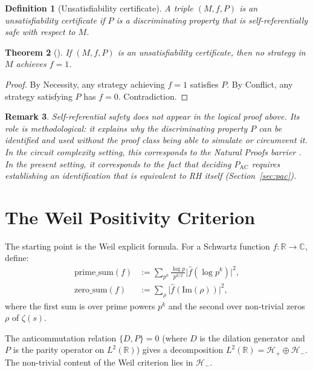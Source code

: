 \documentclass[12pt]{article}
\newtheorem{theorem}{Theorem}[section]
\newtheorem{definition}[theorem]{Definition}
\newtheorem{remark}[theorem]{Remark}
\newcommand{\RR}{\mathbb{R}}
\newcommand{\CC}{\mathbb{C}}
\newcommand{\Hminus}{\mathcal{H}_-}
\newcommand{\PAC}{P_{\mathrm{AC}}}
\begin{document}
\begin{definition}[Unsatisfiability certificate]
A triple $(M, f, P)$ is an \emph{unsatisfiability certificate} if $P$
is a discriminating property that is self-referentially safe with
respect to $M$.
\end{definition}

\begin{theorem}[{\cite[Theorem~2.6]{metamethod2026}}]
\label{thm:framework}
If $(M, f, P)$ is an unsatisfiability certificate, then no strategy
in $M$ achieves $f = 1$.
\end{theorem}

\begin{proof}
By Necessity, any strategy achieving $f=1$ satisfies $P$.
By Conflict, any strategy satisfying $P$ has $f=0$. Contradiction.
\end{proof}

\begin{remark}
Self-referential safety does not appear in the logical proof above.
Its role is \emph{methodological}: it explains why the discriminating
property $P$ can be identified and used without the proof class
being able to simulate or circumvent it. In the circuit complexity
setting, this corresponds to the Natural Proofs barrier
\cite{razborov-rudich1994}. In the present setting, it corresponds
to the fact that deciding $\PAC$ requires establishing an identification
that is equivalent to RH itself (Section~\ref{sec:pac}).
\end{remark}

\section{The Weil Positivity Criterion}
\label{sec:weil}

The starting point is the Weil explicit formula. For a Schwartz
function $f: \RR \to \CC$, define:
\begin{align}
\mathrm{prime\_sum}(f) &:= \sum_{p^k}
  \frac{\log p}{p^{k/2}} \bigl|\hat{f}(\log p^k)\bigr|^2, \\
\mathrm{zero\_sum}(f) &:= \sum_{\rho} \bigl|\hat{f}(\mathrm{Im}(\rho))\bigr|^2,
\end{align}
where the first sum is over prime powers $p^k$ and the second over
non-trivial zeros $\rho$ of $\zeta(s)$.

The anticommutation relation $\{D, P\} = 0$ (where $D$ is the dilation
generator and $P$ is the parity operator on $L^2(\RR)$) gives a
decomposition $L^2(\RR) = \mathcal{H}_+ \oplus \Hminus$. The
non-trivial content of the Weil criterion lies in $\Hminus$.
\end{document}
